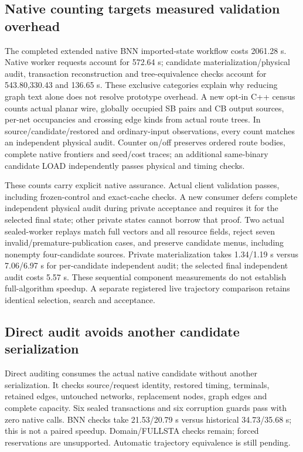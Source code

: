 \documentclass[conference,10pt]{IEEEtran}
\begin{document}
\subsection{Native counting targets measured validation overhead}
The completed extended native BNN imported-state workflow costs 2061.28 s. Native worker requests account for 572.64 s; candidate materialization/physical audit, transaction reconstruction and tree-equivalence checks account for 543.80,330.43 and 136.65 s. These exclusive categories explain why reducing graph text alone does not resolve prototype overhead. A new opt-in C++ census counts actual planar wire, globally occupied SB pairs and CB output sources, per-net occupancies and crossing edge kinds from actual route trees. In source/candidate/restored and ordinary-input observations, every count matches an independent physical audit. Counter on/off preserves ordered route bodies, complete native frontiers and seed/cost traces; an additional same-binary candidate LOAD independently passes physical and timing checks.

These counts carry explicit native assurance. Actual client validation passes, including frozen-control and exact-cache checks. A new consumer defers complete independent physical audit during private acceptance and requires it for the selected final state; other private states cannot borrow that proof. Two actual sealed-worker replays match full vectors and all resource fields, reject seven invalid/premature-publication cases, and preserve candidate menus, including nonempty four-candidate sources. Private materialization takes 1.34/1.19 s versus 7.06/6.97 s for per-candidate independent audit; the selected final independent audit costs 5.57 s. These sequential component measurements do not establish full-algorithm speedup. A separate registered live trajectory comparison retains identical selection, search and acceptance.

\subsection{Direct audit avoids another candidate serialization}
Direct auditing consumes the actual native candidate without another serialization. It checks source/request identity, restored timing, terminals, retained edges, untouched networks, replacement nodes, graph edges and complete capacity. Six sealed transactions and six corruption guards pass with zero native calls. BNN checks take 21.53/20.79 s versus historical 34.73/35.68 s; this is not a paired speedup. Domain/FULLSTA checks remain; forced reservations are unsupported. Automatic trajectory equivalence is still pending.
\end{document}
